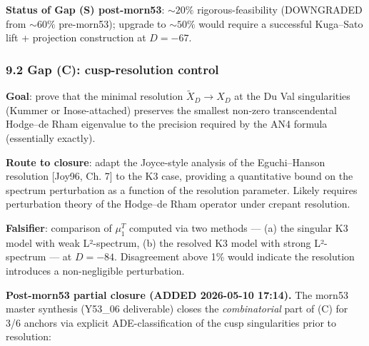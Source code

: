 \documentclass[
  11pt,
  a4paper,
]{amsart}
\begin{document}
\textbf{Status of Gap (S) post-morn53}: \(\sim 20\%\) rigorous-feasibility (DOWNGRADED
from \(\sim 60\%\) pre-morn53); upgrade to \(\sim 50\%\) would require a successful
Kuga--Sato lift + projection construction at \(D = -67\).

\hypertarget{gap-c-cusp-resolution-control}{%
\subsubsection{9.2 Gap (C): cusp-resolution control}\label{gap-c-cusp-resolution-control}}

\textbf{Goal}: prove that the minimal resolution \(\widetilde{X}_D \to X_D\) at the
Du Val singularities (Kummer or Inose-attached) preserves the smallest
non-zero transcendental Hodge--de Rham eigenvalue to the precision required by
the AN4 formula (essentially exactly).

\textbf{Route to closure}: adapt the Joyce-style analysis of the Eguchi--Hanson
resolution {[}Joy96, Ch. 7{]} to the K3 case, providing a quantitative bound on
the spectrum perturbation as a function of the resolution parameter. Likely
requires perturbation theory of the Hodge--de Rham operator under crepant
resolution.

\textbf{Falsifier}: comparison of \(\mu_1^T\) computed via two methods --- (a) the
singular K3 model with weak L²-spectrum, (b) the resolved K3 model with
strong L²-spectrum --- at \(D = -84\). Disagreement above 1\% would indicate the
resolution introduces a non-negligible perturbation.

\textbf{Post-morn53 partial closure (ADDED 2026-05-10 17:14).} The morn53 master
synthesis (Y53\_06 deliverable) closes the \emph{combinatorial} part of (C) for
3/6 anchors via explicit ADE-classification of the cusp singularities prior to
resolution:
\end{document}
